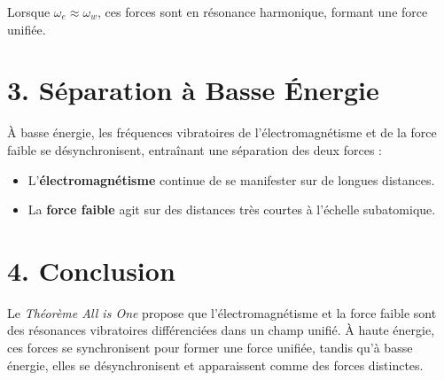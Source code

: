 \documentclass{article}
\begin{document}
Lorsque \( \omega_e \approx \omega_w \), ces forces sont en résonance harmonique, formant une force unifiée.

\section{3. Séparation à Basse Énergie}

À basse énergie, les fréquences vibratoires de l'électromagnétisme et de la force faible se désynchronisent, entraînant une séparation des deux forces :
\begin{itemize}
    \item L'\textbf{électromagnétisme} continue de se manifester sur de longues distances.
    \item La \textbf{force faible} agit sur des distances très courtes à l'échelle subatomique.
\end{itemize}

\section{4. Conclusion}

Le \textit{Théorème All is One} propose que l'électromagnétisme et la force faible sont des résonances vibratoires différenciées dans un champ unifié. À haute énergie, ces forces se synchronisent pour former une force unifiée, tandis qu'à basse énergie, elles se désynchronisent et apparaissent comme des forces distinctes.
\end{document}
